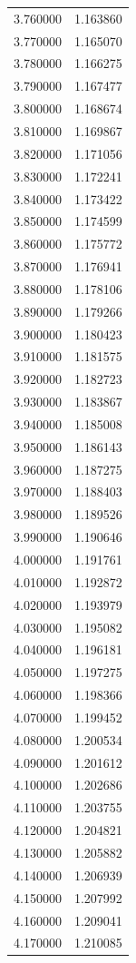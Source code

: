 \begin{tabular}{rr}
3.760000 & 1.163860 \\
3.770000 & 1.165070 \\
3.780000 & 1.166275 \\
3.790000 & 1.167477 \\
3.800000 & 1.168674 \\
3.810000 & 1.169867 \\
3.820000 & 1.171056 \\
3.830000 & 1.172241 \\
3.840000 & 1.173422 \\
3.850000 & 1.174599 \\
3.860000 & 1.175772 \\
3.870000 & 1.176941 \\
3.880000 & 1.178106 \\
3.890000 & 1.179266 \\
3.900000 & 1.180423 \\
3.910000 & 1.181575 \\
3.920000 & 1.182723 \\
3.930000 & 1.183867 \\
3.940000 & 1.185008 \\
3.950000 & 1.186143 \\
3.960000 & 1.187275 \\
3.970000 & 1.188403 \\
3.980000 & 1.189526 \\
3.990000 & 1.190646 \\
4.000000 & 1.191761 \\
4.010000 & 1.192872 \\
4.020000 & 1.193979 \\
4.030000 & 1.195082 \\
4.040000 & 1.196181 \\
4.050000 & 1.197275 \\
4.060000 & 1.198366 \\
4.070000 & 1.199452 \\
4.080000 & 1.200534 \\
4.090000 & 1.201612 \\
4.100000 & 1.202686 \\
4.110000 & 1.203755 \\
4.120000 & 1.204821 \\
4.130000 & 1.205882 \\
4.140000 & 1.206939 \\
4.150000 & 1.207992 \\
4.160000 & 1.209041 \\
4.170000 & 1.210085 \\

\end{tabular}

